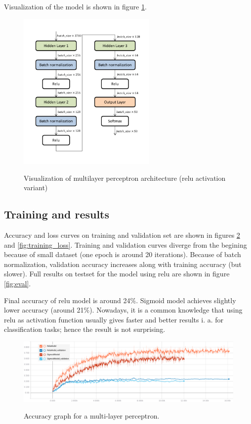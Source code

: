 \documentclass[a4paper]{article}
\begin{document}
Visualization of the model is shown in figure \ref{fig:arch}.

\begin{figure}[h]
    \caption[]{Visualization of multilayer perceptron architecture (relu activation variant)}
    \centering
    \includegraphics[page=1,width=0.6\textwidth]{architecture.pdf}
    \label{fig:arch}
\end{figure}

\subsection{Training and results}
Accuracy and loss curves on training and validation set are shown in figures \ref{fig:training_accuracy} and \ref{fig:training_loss}.
Training and validation curves diverge from the begining because of small dataset (one epoch is around 20 iterations).
Because of batch normalization, validation accuracy increases along with training accuracy (but slower).
Full results on testset for the model using relu are shown in figure \ref{fig:eval}.

Final accuracy of relu model is around 24\%.
Sigmoid model achieves slightly lower accuracy (around 21\%).
Nowadays, it is a common knowledge that using relu as activation function
usually gives faster and better results i. a. for classification tasks;
hence the result is not surprising.

\begin{figure}[h]
    \caption[]{Accuracy graph for a multi-layer perceptron.}
    \centering
    \includegraphics[page=2,width=1.0\textwidth]{training_accuracy.png}
    \label{fig:training_accuracy}
\end{figure}
\end{document}
